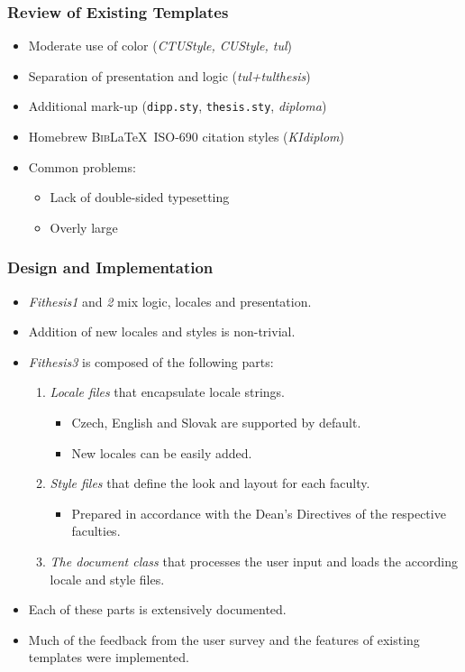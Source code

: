 \documentclass[12pt]{beamer}
\begin{document}
  \begin{frame}
    \frametitle{Review of Existing Templates}
    \begin{itemize}[<+->]
      \item Moderate use of color (\emph{CTUStyle, CUStyle, tul})
      \item Separation of presentation and logic (\emph{tul+tulthesis})
      \item Additional mark-up (\texttt{dipp.sty}, \texttt{thesis.sty}, \emph{diploma})
      \item Homebrew \textsc{Bib}\LaTeX\ ISO-690 citation styles (\emph{KIdiplom})
      \item Common problems:
      \begin{itemize}
        \item Lack of double-sided typesetting
        \item Overly large \texttt{\string\textwidth}
      \end{itemize}
    \end{itemize}
  \end{frame}
  \begin{frame}
    \frametitle{Design and Implementation}
    \begin{itemize}[<+->]
      \item \emph{Fithesis1} and \emph{2} mix logic, locales and presentation.
      \item Addition of new locales and styles is non-trivial.
      \item \emph{Fithesis3} is composed of the following parts:\begin{enumerate}
        \item\emph{Locale files} that encapsulate locale strings.
          \begin{itemize}
            \item Czech, English and Slovak are supported by default.
            \item New locales can be easily added.
          \end{itemize}
        \item\emph{Style files} that define the look and layout for each faculty.
          \begin{itemize}
            \item Prepared in accordance with the Dean's Directives of the respective faculties.
          \end{itemize}
        \item\emph{The document class} that processes the user input and loads
          the according locale and style files.
      \end{enumerate}
      \item Each of these parts is extensively documented.
      \item Much of the feedback from the user survey and the features of existing templates were implemented.
    \end{itemize}
  \end{frame}
\end{document}
